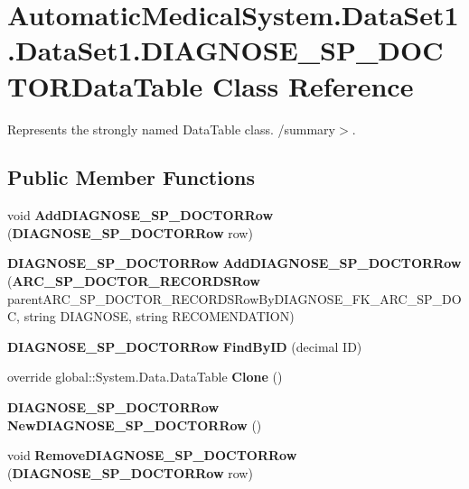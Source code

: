 \section{AutomaticMedicalSystem.DataSet1.DataSet1.DIAGNOSE\_\-SP\_\-DOCTORDataTable Class Reference}
\label{class_automatic_medical_system_1_1_data_set1_1_1_d_i_a_g_n_o_s_e___s_p___d_o_c_t_o_r_data_table}
Represents the strongly named DataTable class. /summary$>$.  


\subsection*{Public Member Functions}
\begin{CompactItemize}
\item 
void \textbf{AddDIAGNOSE\_\-SP\_\-DOCTORRow} ({\bf DIAGNOSE\_\-SP\_\-DOCTORRow} row)\label{class_automatic_medical_system_1_1_data_set1_1_1_d_i_a_g_n_o_s_e___s_p___d_o_c_t_o_r_data_table_5b85f866a62cfa8b97cb379f0068b327}

\item 
{\bf DIAGNOSE\_\-SP\_\-DOCTORRow} \textbf{AddDIAGNOSE\_\-SP\_\-DOCTORRow} ({\bf ARC\_\-SP\_\-DOCTOR\_\-RECORDSRow} parentARC\_\-SP\_\-DOCTOR\_\-RECORDSRowByDIAGNOSE\_\-FK\_\-ARC\_\-SP\_\-DOC, string DIAGNOSE, string RECOMENDATION)\label{class_automatic_medical_system_1_1_data_set1_1_1_d_i_a_g_n_o_s_e___s_p___d_o_c_t_o_r_data_table_8c7a2af8327f92d0dff5707b4bde1b55}

\item 
{\bf DIAGNOSE\_\-SP\_\-DOCTORRow} \textbf{FindByID} (decimal ID)\label{class_automatic_medical_system_1_1_data_set1_1_1_d_i_a_g_n_o_s_e___s_p___d_o_c_t_o_r_data_table_9273b8c3828e73320ff6f6822e0d3577}

\item 
override global::System.Data.DataTable \textbf{Clone} ()\label{class_automatic_medical_system_1_1_data_set1_1_1_d_i_a_g_n_o_s_e___s_p___d_o_c_t_o_r_data_table_f56d3dd43adefc61034797ef951a83c6}

\item 
{\bf DIAGNOSE\_\-SP\_\-DOCTORRow} \textbf{NewDIAGNOSE\_\-SP\_\-DOCTORRow} ()\label{class_automatic_medical_system_1_1_data_set1_1_1_d_i_a_g_n_o_s_e___s_p___d_o_c_t_o_r_data_table_daa8439a532fa4def9fdffa7a15f1cb1}

\item 
void \textbf{RemoveDIAGNOSE\_\-SP\_\-DOCTORRow} ({\bf DIAGNOSE\_\-SP\_\-DOCTORRow} row)\label{class_automatic_medical_system_1_1_data_set1_1_1_d_i_a_g_n_o_s_e___s_p___d_o_c_t_o_r_data_table_e1f4932e1a9e1f05e72a47f7c6870169}

\end{CompactItemize}
